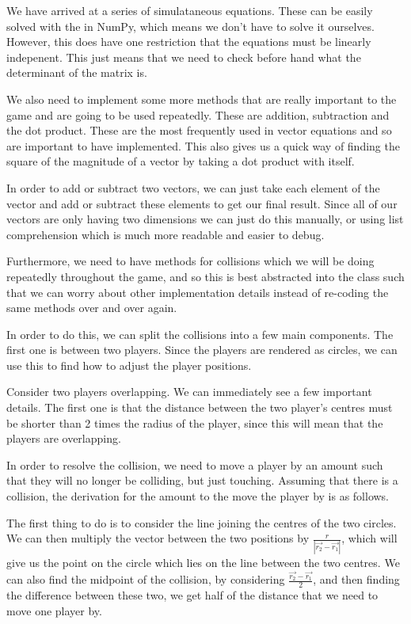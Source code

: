 \vs
We have arrived at a series of simulataneous equations. These can be easily solved with the  in NumPy, which means we don't have to solve it ourselves. However, this does have one restriction that the equations must be linearly indepenent. This just means that we need to check before hand what the determinant of the matrix is.
\vs

We also need to implement some more methods that are really important to the game and are going to be used repeatedly. These are addition, subtraction and the dot product. These are the most frequently used in vector equations and so are important to have implemented. This also gives us a quick way of finding the square of the magnitude of a vector by taking a dot product with itself.

\vs
In order to add or subtract two vectors, we can just take each element of the vector and add or subtract these elements to get our final result. Since all of our vectors are only having two dimensions we can just do this manually, or using list comprehension which is much more readable and easier to debug.

\vs
Furthermore, we need to have methods for collisions which we will be doing repeatedly throughout the game, and so this is best abstracted into the  class such that we can worry about other implementation details instead of re-coding the same methods over and over again.

\vs
In order to do this, we can split the collisions into a few main components. The first one is between two players. Since the players are rendered as circles, we can use this to find how to adjust the player positions.

\vs
Consider two players overlapping. We can immediately see a few important details. The first one is that the distance between the two player's centres must be shorter than 2 times the radius of the player, since this will mean that the players are overlapping.

\vs
In order to resolve the collision, we need to move a player by an amount such that they will no longer be colliding, but just touching. Assuming that there is a collision, the derivation for the amount to the move the player by is as follows.
\vs


The first thing to do is to consider the line joining the centres of the two circles. We can then multiply the vector between the two positions by $\frac{r}{|\vec{r_2} - \vec{r_1}|}$, which will give us the point on the circle which lies on the line between the two centres. We can also find the midpoint of the collision, by considering $\frac{\vec{r_2} - \vec{r_1}}{2}$, and then finding the difference between these two, we get half of the distance that we need to move one player by.

